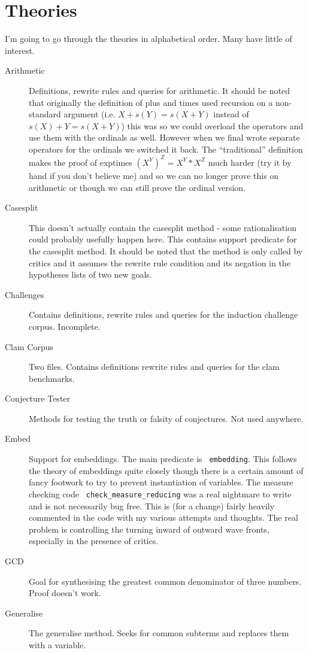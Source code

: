 \section{Theories}
I'm going to go through the theories in alphabetical order.  Many have 
little of interest.
\begin{description}
\item[Arithmetic]
  Definitions, rewrite rules
  and queries for arithmetic.  It should be noted that
  originally the 
  definition of plus and times used recursion
  on a non-standard 
  argument (i.e. $X + s(Y) = s(X + Y)$ instead of $s(X) + Y = s(X +
  Y)$) this was so we could overload the operators and use them with
  the ordinals as well.  However when we final wrote
  separate operators for the ordinals we switched it back.  The
  ``traditional'' definition makes the proof of
  exptimes $(X^Y)^Z = X^Y * X^Z$ much harder (try it
  by hand if you don't believe me) and so we can no longer prove this
  on arithmetic or though we can still prove the
  ordinal version.
\item[Casesplit] This doesn't actually contain 
  the casesplit method - some rationalisation
  could probably usefully 
  happen here.  This contains support predicate for the casesplit
  method.  It should be noted that the method is only called by
  critics and it assumes the rewrite rule condition and its negation
  in the hypotheses lists of two new goals.
\item[Challenges] Contains definitions,
  rewrite rules and queries for the induction challenge corpus.
  Incomplete.
\item[Clam Corpus] Two files.  Contains
  definitions rewrite rules and queries for the clam benchmarks.
\item[Conjecture Tester]  Methods for
  testing the truth or falsity of conjectures.  Not used anywhere.
\item[Embed] Support for
  embeddings.  The main predicate is {\tt
    embedding}.  This follows the theory of embeddings quite closely
  though there is a certain amount of fancy footwork to try to prevent 
  instantiation of variables.  The measure checking code {\tt
    check\_measure\_reducing} was a
  real nightmare to write and is not necessarily bug free.  This is
  (for a change) fairly heavily commented in the code with my various
  attempts and thoughts.  The real problem is controlling the turning
  inward of outward wave fronts, especially in the presence of
  critics.
\item[GCD] Goal for synthesising the greatest common 
  denominator of three numbers.  Proof doesn't work.
\item[Generalise] The generalise
  method.  Seeks for common subterms and
  replaces them with a variable.


\end{description}
